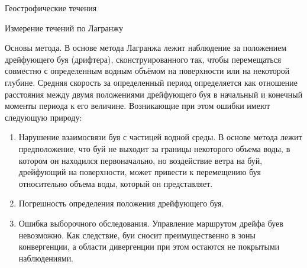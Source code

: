 \begin{chapter}{Геострофические течения}
\begin{section}{Измерение течений по Лагранжу}
\begin{paragraph}{Основы метода.}
В основе метода Лагранжа лежит наблюдение за положением дрейфующего буя 
(дрифтера), сконструированного так, чтобы перемещаться совместно 
с определенным водным объёмом на поверхности или на
некоторой глубине. Средняя скорость за определенный период
определяется как отношение расстояния между двумя положениями дрейфующего буя
в начальный и конечный моменты периода к его величине. Возникающие при
этом ошибки имеют следующую природу:
%
\begin{enumerate}
\item
Нарушение взаимосвязи буя с частицей водной среды. 
В основе метода лежит предположение, что буй не выходит за границы некоторого 
объема воды, в котором он находился первоначально, но воздействие ветра на
буй, дрейфующий на поверхности, может привести к перемещению буя относительно 
объема воды, который он представляет.
%

\item
Погрешность определения положения дрейфующего буя.
%

\item
Ошибка выборочного обследования. Управление маршрутом дрейфа буев%
 невозможно. Как следствие,
буи сносит преимущественно в зоны конвергенции, а области дивергенции при этом
остаются не покрытыми наблюдениями.
%
\end{enumerate}


\end{paragraph}
\end{section}
\end{chapter}
